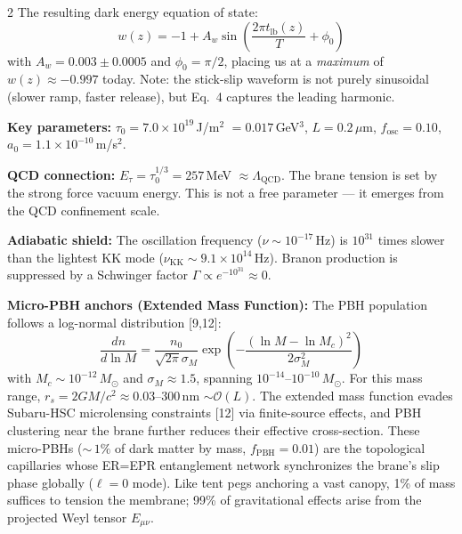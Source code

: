 \documentclass[11pt]{article}
\begin{document}
\begin{multicols}{2}
The resulting dark energy equation of state:
\begin{equation}
w(z) = -1 + A_w \sin\!\left(\frac{2\pi t_\text{lb}(z)}{T} + \phi_0\right)
\end{equation}
with $A_w = 0.003 \pm 0.0005$ and $\phi_0 = \pi/2$, placing us at a \textit{maximum} of $w(z) \approx -0.997$ today. Note: the stick-slip waveform is not purely sinusoidal (slower ramp, faster release), but Eq.~4 captures the leading harmonic.

\textbf{Key parameters:}
$\tau_0 = 7.0 \times 10^{19}$\,J/m$^2$ $= 0.017$\,GeV$^3$,
$L = 0.2\,\mu$m,
$f_\text{osc} = 0.10$,
$a_0 = 1.1 \times 10^{-10}$\,m/s$^2$.

\textbf{QCD connection:} $E_\tau = \tau_0^{1/3} = 257$\,MeV $\approx \Lambda_\text{QCD}$. The brane tension is set by the strong force vacuum energy. This is not a free parameter --- it emerges from the QCD confinement scale.

\textbf{Adiabatic shield:} The oscillation frequency ($\nu \sim 10^{-17}$\,Hz) is $10^{31}$ times slower than the lightest KK mode ($\nu_\text{KK} \sim 9.1 \times 10^{14}$\,Hz). Branon production is suppressed by a Schwinger factor $\Gamma \propto e^{-10^{31}} \approx 0$.

\textbf{Micro-PBH anchors (Extended Mass Function):} The PBH population follows a log-normal distribution [9,12]:
\begin{equation}
\frac{dn}{d\ln M} = \frac{n_0}{\sqrt{2\pi}\sigma_M}\exp\!\left(-\frac{(\ln M - \ln M_c)^2}{2\sigma_M^2}\right)
\end{equation}
with $M_c \sim 10^{-12}\,M_\odot$ and $\sigma_M \approx 1.5$, spanning $10^{-14}$--$10^{-10}\,M_\odot$. For this mass range, $r_s = 2GM/c^2 \approx 0.03$--$300$\,nm $\sim \mathcal{O}(L)$. The extended mass function evades Subaru-HSC microlensing constraints [12] via finite-source effects, and PBH clustering near the brane further reduces their effective cross-section. These micro-PBHs (${\sim}\,1\%$ of dark matter by mass, $f_\text{PBH} = 0.01$) are the topological capillaries whose ER=EPR entanglement network synchronizes the brane's slip phase globally ($\ell=0$ mode). Like tent pegs anchoring a vast canopy, 1\% of mass suffices to tension the membrane; 99\% of gravitational effects arise from the projected Weyl tensor $E_{\mu\nu}$.


\end{multicols}
\end{document}
